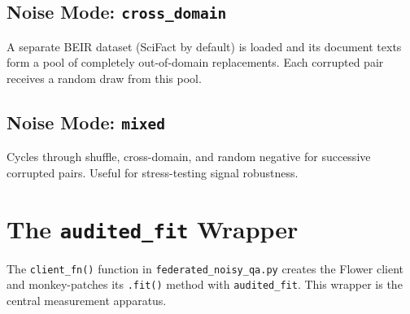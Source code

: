\documentclass[12pt,a4paper]{article}
\begin{document}
\subsection{Noise Mode: \texttt{cross\_domain}}

A separate BEIR dataset (SciFact by default) is loaded and its document texts form a pool of completely out-of-domain replacements. Each corrupted pair receives a random draw from this pool.

\subsection{Noise Mode: \texttt{mixed}}

Cycles through shuffle, cross-domain, and random negative for successive corrupted pairs. Useful for stress-testing signal robustness.

\section{The \texttt{audited\_fit} Wrapper}

The \texttt{client\_fn()} function in \texttt{federated\_noisy\_qa.py} creates the Flower client and monkey-patches its \texttt{.fit()} method with \texttt{audited\_fit}. This wrapper is the central measurement apparatus.
\end{document}
